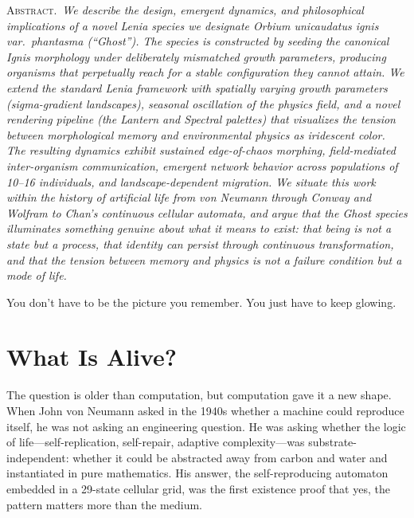 \documentclass[11pt,a4paper]{article}
\newcommand{\spc}[1]{\textit{#1}}
\begin{document}
\begin{center}
\begin{minipage}{0.82\linewidth}
  \small\color{muted}
  \textsc{Abstract.}\,\itshape
  We describe the design, emergent dynamics, and philosophical implications
  of a novel Lenia species we designate \spc{Orbium unicaudatus ignis} var.\
  \spc{phantasma} (``Ghost''). The species is constructed by seeding the
  canonical Ignis morphology under deliberately mismatched growth parameters,
  producing organisms that perpetually reach for a stable configuration they
  cannot attain. We extend the standard Lenia framework with spatially
  varying growth parameters (sigma-gradient landscapes), seasonal oscillation
  of the physics field, and a novel rendering pipeline (the Lantern and
  Spectral palettes) that visualizes the tension between morphological memory
  and environmental physics as iridescent color. The resulting dynamics
  exhibit sustained edge-of-chaos morphing, field-mediated inter-organism
  communication, emergent network behavior across populations of 10--16
  individuals, and landscape-dependent migration. We situate this work within
  the history of artificial life from von Neumann through Conway and Wolfram
  to Chan's continuous cellular automata, and argue that the Ghost species
  illuminates something genuine about what it means to exist: that being is
  not a state but a process, that identity can persist through continuous
  transformation, and that the tension between memory and physics is not a
  failure condition but a mode of life.
\end{minipage}
\end{center}

\vspace{20pt}
\begin{center}
\begin{pullquote}
You don't have to be the picture you remember. You just have to keep glowing.
\end{pullquote}
\end{center}

\clearpage

\section{What Is Alive?}

The question is older than computation, but computation gave it a new shape.
When John von Neumann asked in the 1940s whether a machine could reproduce
itself, he was not asking an engineering question. He was asking whether the
logic of life---self-replication, self-repair, adaptive complexity---was
substrate-independent: whether it could be abstracted away from carbon and
water and instantiated in pure mathematics. His answer, the self-reproducing
automaton embedded in a 29-state cellular grid, was the first existence
proof that yes, the pattern matters more than the medium.
\end{document}
